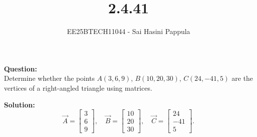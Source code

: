 \documentclass[journal]{IEEEtran}
\begin{document}

\vspace{3cm}

\title{2.4.41}
\author{EE25BTECH11044 - Sai Hasini Pappula}
 \maketitle
{\let\newpage\relax\maketitle}

\renewcommand{\thefigure}{\theenumi}
\renewcommand{\thetable}{\theenumi}
\setlength{\intextsep}{10pt} %


\renewcommand{\thetable}{\theenumi}

\textbf{Question:} \\
Determine whether the points 
$A(3,6,9)$, $B(10,20,30)$, $C(24,-41,5)$
are the vertices of a right-angled triangle using matrices.

\bigskip

\textbf{Solution:} \\

\begin{equation}
\vec{A}=\begin{bmatrix}3\\6\\9\end{bmatrix},\quad
\vec{B}=\begin{bmatrix}10\\20\\30\end{bmatrix},\quad
\vec{C}=\begin{bmatrix}24\\-41\\5\end{bmatrix}.
\tag{1}
\end{equation}
\end{document}
